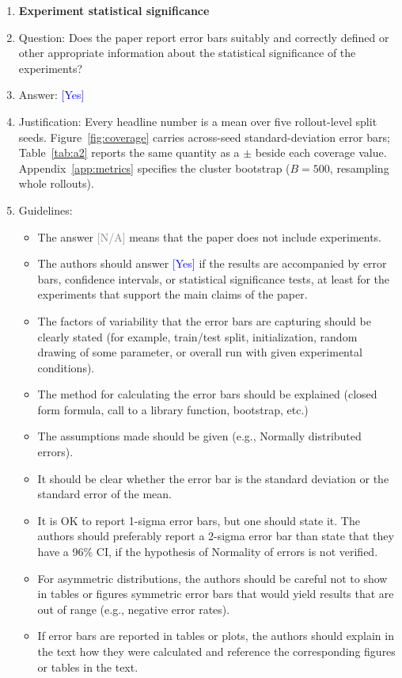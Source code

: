 \documentclass{article}
\providecommand{\answerYes}[1][]{\textcolor{blue}{[Yes] #1}}
\providecommand{\answerNA}[1][]{\textcolor{gray}{[N/A] #1}}
\begin{document}
\begin{enumerate}
\item {\bf Experiment statistical significance}
    \item[] Question: Does the paper report error bars suitably and correctly defined or other appropriate information about the statistical significance of the experiments?
    \item[] Answer: \answerYes{}
    \item[] Justification: Every headline number is a mean over five rollout-level split seeds. Figure~\ref{fig:coverage} carries across-seed standard-deviation error bars; Table~\ref{tab:a2} reports the same quantity as a $\pm$ beside each coverage value. Appendix~\ref{app:metrics} specifies the cluster bootstrap ($B = 500$, resampling whole rollouts).
    \item[] Guidelines:
    \begin{itemize}
        \item The answer \answerNA{} means that the paper does not include experiments.
        \item The authors should answer \answerYes{} if the results are accompanied by error bars, confidence intervals, or statistical significance tests, at least for the experiments that support the main claims of the paper.
        \item The factors of variability that the error bars are capturing should be clearly stated (for example, train/test split, initialization, random drawing of some parameter, or overall run with given experimental conditions).
        \item The method for calculating the error bars should be explained (closed form formula, call to a library function, bootstrap, etc.)
        \item The assumptions made should be given (e.g., Normally distributed errors).
        \item It should be clear whether the error bar is the standard deviation or the standard error of the mean.
        \item It is OK to report 1-sigma error bars, but one should state it. The authors should preferably report a 2-sigma error bar than state that they have a 96\% CI, if the hypothesis of Normality of errors is not verified.
        \item For asymmetric distributions, the authors should be careful not to show in tables or figures symmetric error bars that would yield results that are out of range (e.g., negative error rates).
        \item If error bars are reported in tables or plots, the authors should explain in the text how they were calculated and reference the corresponding figures or tables in the text.
    \end{itemize}


\end{enumerate}
\end{document}
